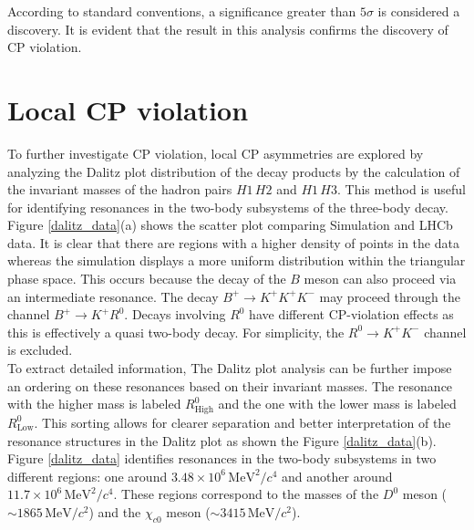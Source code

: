     According to standard conventions, a significance greater than \(5\sigma\) is considered a discovery. It is evident that the result in this analysis confirms the discovery of CP violation.
    \\

    \section{Local CP violation}
    To further investigate CP violation, local CP asymmetries are explored by analyzing the Dalitz plot distribution of the decay products by the calculation of the invariant masses of the hadron pairs \( H1\,H2 \) and \( H1\, H3 \). This method is  useful for identifying resonances in the two-body subsystems of the three-body decay. 
    \\ 
    
    Figure \ref{dalitz_data}(a) shows the scatter plot comparing Simulation and LHCb data. It is clear that there are regions with a higher density of points in the data whereas the simulation displays a more uniform distribution within the triangular phase space. This occurs because the decay of the \(B\) meson can also proceed via an intermediate resonance. The decay \(B^+ \to K^+ K^+ K^-\) may proceed through the channel \(B^+ \to K^+ R^0\). Decays involving \( R^0 \) have different CP-violation effects as this is effectively a quasi two-body decay. For simplicity, the \( R^0 \to K^+ K^- \) channel is excluded.
    \\
    
     To extract detailed information, The Dalitz plot analysis can be further impose an ordering on these resonances based on their invariant masses. The resonance with the higher mass is labeled \( R^0_{\text{High}} \) and the one with the lower mass is labeled \( R^0_{\text{Low}} \). This sorting allows for clearer separation and better interpretation of the resonance structures in the Dalitz plot as shown the Figure \ref{dalitz_data}(b).
     \\

    Figure \ref{dalitz_data} identifies resonances in the two-body subsystems in two different regions: one around \(3.48 \times 10^6\,\mathrm{MeV}^2/c^4\) and another around \(11.7 \times 10^6\,\mathrm{MeV}^2/c^4\). These regions correspond to the masses of the \(D^0\) meson (\(\sim 1865\,\mathrm{MeV}/c^2\)) and the \(\chi_{c0}\) meson (\(\sim 3415\,\mathrm{MeV}/c^2\)).

